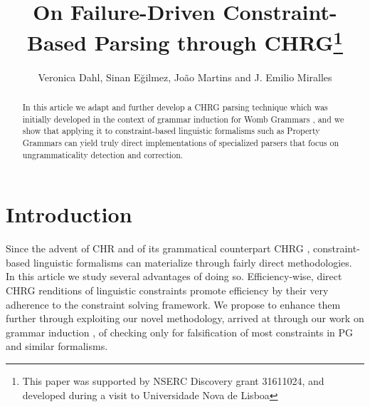 \documentclass{llncs}
\begin{document}
%
%
\mainmatter              %
%
\title{On Failure-Driven Constraint-Based Parsing through CHRG\thanks{This paper was supported by NSERC  Discovery grant 31611024, and developed during a visit to Universidade Nova de Lisboa}}
%
%
\author{Veronica Dahl, Sinan Eğilmez, João Martins and J. Emilio Miralles}
%
%
%
\maketitle              %


\begin{abstract}

In this article we adapt and further develop  a CHRG parsing technique which was initially developed in the context of grammar induction for Womb Grammars \cite{DM12}, and we show that applying it to constraint-based linguistic formalisms such as Property Grammars \cite{Blache} can yield truly direct implementations of specialized parsers that focus on ungrammaticality detection and correction.

\end{abstract}
%

\section{Introduction}
% 

Since the advent of CHR \cite{Fruhwirth98} and of its grammatical counterpart CHRG \cite{Christiansen01}, constraint-based linguistic formalisms can materialize through fairly direct methodologies.   In this article we study several advantages of doing so. Efficiency-wise, direct CHRG renditions of linguistic constraints promote efficiency by their very adherence to  the constraint solving framework. We propose to enhance them further through exploiting our novel  methodology, arrived at through our work on grammar induction \cite{DM12}, of  checking only for falsification of most constraints in PG \cite{Blache} and similar formalisms.
%  
\end{document}
